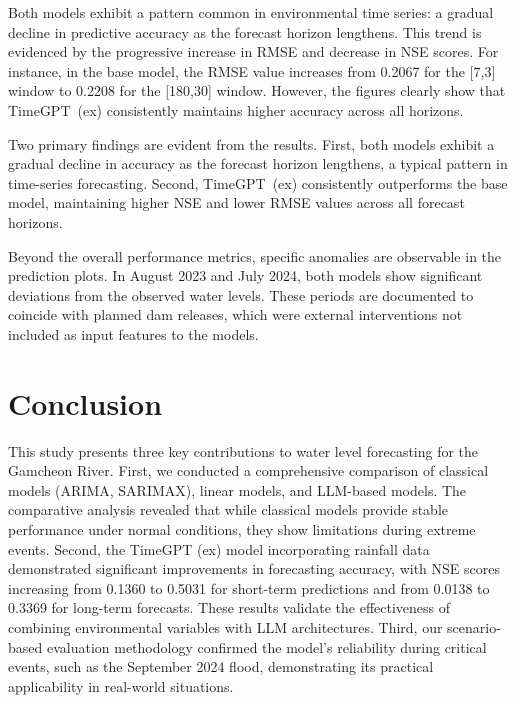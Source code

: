 \documentclass[a4paper,twoside,flushend, 10pt]{article}
\begin{document}
Both models exhibit a pattern common in environmental time series: a gradual decline in predictive accuracy as the forecast horizon lengthens. This trend is evidenced by the progressive increase in RMSE and decrease in NSE scores. For instance, in the base model, the RMSE value increases from 0.2067 for the [7,3] window to 0.2208 for the [180,30] window. However, the figures clearly show that TimeGPT~(ex) consistently maintains higher accuracy across all horizons.

Two primary findings are evident from the results. First, both models exhibit a gradual decline in accuracy as the forecast horizon lengthens, a typical pattern in time-series forecasting. Second, TimeGPT~(ex) consistently outperforms the base model, maintaining higher NSE and lower RMSE values across all forecast horizons.

Beyond the overall performance metrics, specific anomalies are observable in the prediction plots. In August 2023 and July 2024, both models show significant deviations from the observed water levels. These periods are documented to coincide with planned dam releases, which were external interventions not included as input features to the models.



\section{Conclusion}

This study presents three key contributions to water level forecasting for the Gamcheon River. First, we conducted a comprehensive comparison of classical models (ARIMA, SARIMAX), linear models, and LLM-based models. The comparative analysis revealed that while classical models provide stable performance under normal conditions, they show limitations during extreme events. Second, the TimeGPT (ex) model incorporating rainfall data demonstrated significant improvements in forecasting accuracy, with NSE scores increasing from 0.1360 to 0.5031 for short-term predictions and from 0.0138 to 0.3369 for long-term forecasts. These results validate the effectiveness of combining environmental variables with LLM architectures. Third, our scenario-based evaluation methodology confirmed the model's reliability during critical events, such as the September 2024 flood, demonstrating its practical applicability in real-world situations.
\end{document}
